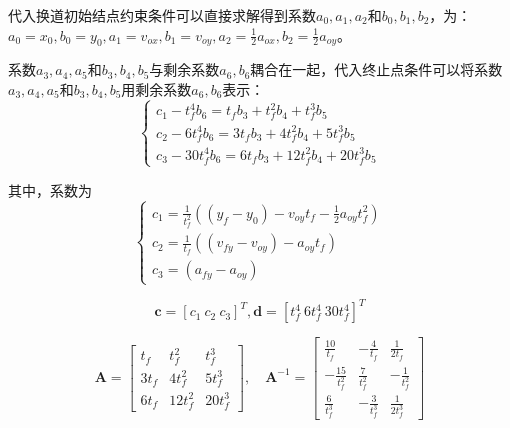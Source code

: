     代入换道初始结点约束条件可以直接求解得到系数$a_0,a_1,a_2$和$b_0,b_1,b_2$，为：$a_0 = x_0, b_0 = y_0, a_1 = v_{ox}, b_1 = v_{oy}, a_2 = \frac{1}{2}a_{ox}, b_2 = \frac{1}{2}a_{oy}$。

    系数$a_3,a_4,a_5$和$b_3,b_4,b_5$与剩余系数$a_6,b_6$耦合在一起，代入终止点条件可以将系数$a_3,a_4,a_5$和$b_3,b_4,b_5$用剩余系数$a_6,b_6$表示：
    \begin{equation}
    \begin{cases}
    c_1 - t_f^4 b_6 = t_f b_3 + t_f^2 b_4 + t_f^3 b_5 \\
    c_2 - 6t_f^4 b_6 = 3t_f b_3 + 4t_f^2 b_4 + 5t_f^3 b_5 \\
    c_3 - 30t_f^4 b_6 = 6t_f b_3 + 12t_f^2 b_4 + 20t_f^3 b_5
    \end{cases}
    \label{eq:130}
    \end{equation}

    \noindent 其中，系数为
    \begin{equation}
    \begin{cases}
    c_1 = \frac{1}{t_f^2}\left( (y_f - y_0) - v_{oy} t_f - \frac{1}{2}a_{oy} t_f^2 \right) \\
    c_2 = \frac{1}{t_f}\left( (v_{fy} - v_{oy}) - a_{oy} t_f \right) \\
    c_3 = (a_{fy} - a_{oy})
    \end{cases}
    \label{eq:131}
    \end{equation}

    \begin{equation}
    \boldsymbol{c} = [c_1\ c_2\ c_3]^T, \boldsymbol{d} = [t_f^4\ 6t_f^4\ 30t_f^4]^T
    \label{eq:132}
    \end{equation}
    
    \begin{equation}
    \boldsymbol{A} = \begin{bmatrix}
    t_f & t_f^2 & t_f^3 \\
    3t_f & 4t_f^2 & 5t_f^3 \\
    6t_f & 12t_f^2 & 20t_f^3
    \end{bmatrix}, \quad \boldsymbol{A}^{-1} = \begin{bmatrix}
    \frac{10}{t_f} & -\frac{4}{t_f} & \frac{1}{2t_f} \\
    -\frac{15}{t_f^2} & \frac{7}{t_f^2} & -\frac{1}{t_f^2} \\
    \frac{6}{t_f^3} & -\frac{3}{t_f^3} & \frac{1}{2t_f^3}
    \end{bmatrix}
    \label{eq:133}
    \end{equation}

